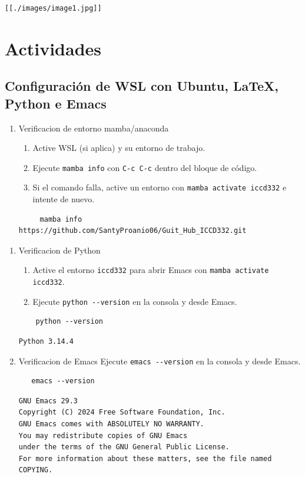 \documentclass{article}
\begin{document}
\begin{verbatim}
[[./images/image1.jpg]]
\end{verbatim}
\section{Actividades}
\label{sec:org0ceb3c8}
\subsection{Configuración de WSL con Ubuntu, \LaTeX, Python e Emacs}
\label{sec:orgc3dd327}

\begin{enumerate}
\item Verificacion de entorno mamba/anaconda
\begin{enumerate}
\item Active WSL (si aplica) y su entorno de trabajo.
\item Ejecute \texttt{mamba info} con \texttt{C-c C-c} dentro del bloque de código.
\item Si el comando falla, active un entorno con \texttt{mamba activate iccd332} e intente de nuevo.
\end{enumerate}

\begin{verbatim}
     mamba info https://github.com/SantyProanio06/Guit_Hub_ICCD332.git
\end{verbatim}
\end{enumerate}


\begin{enumerate}
\item Verificacion de Python
\begin{enumerate}
\item Active el entorno \texttt{iccd332} para abrir Emacs con \texttt{mamba activate iccd332}.
\item Ejecute \texttt{python -{}-{}version} en la consola y desde Emacs.
\end{enumerate}

\begin{verbatim}
    python --version
\end{verbatim}

\begin{verbatim}
Python 3.14.4
\end{verbatim}

\item Verificacion de Emacs
Ejecute \texttt{emacs -{}-{}version} en la consola y desde Emacs.

\begin{verbatim}
   emacs --version
\end{verbatim}

\begin{verbatim}
GNU Emacs 29.3
Copyright (C) 2024 Free Software Foundation, Inc.
GNU Emacs comes with ABSOLUTELY NO WARRANTY.
You may redistribute copies of GNU Emacs
under the terms of the GNU General Public License.
For more information about these matters, see the file named COPYING.
\end{verbatim}
\end{enumerate}
\end{document}
